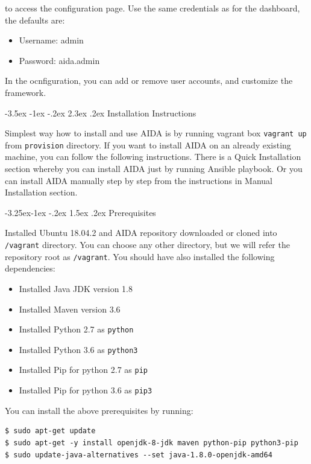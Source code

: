 \documentclass[a4paper]{article} %
\makeatletter
\renewcommand\section{\@startsection {section}{1}{\z@}%
                   {-3.5ex \@plus -1ex \@minus -.2ex}%
                   {2.3ex \@plus.2ex}%
                   {\normalfont\sffamily\Large\bfseries\color{projectcolor}}}
\renewcommand\subsection{\@startsection{subsection}{2}{\z@}%
                   {-3.25ex\@plus -1ex \@minus -.2ex}%
                   {1.5ex \@plus .2ex}%
                   {\normalfont\sffamily\large\bfseries\color{projectcolor}}}
\makeatother
\begin{document}
to access the configuration page. Use the same credentials as for the dashboard, the defaults are:
\begin{itemize}[noitemsep,nolistsep]
  \item[] Username: admin
  \item[] Password: aida.admin
\end{itemize}
In the ocnfiguration, you can add or remove user accounts, and customize the framework.

\cleardoublepage

\section{Installation Instructions}

Simplest way how to install and use AIDA is by running vagrant box \texttt{vagrant up} from \texttt{provision} directory.
If you want to install AIDA on an already existing machine, you can follow the following instructions. There is a Quick Installation
section whereby you can install AIDA just by running Ansible playbook. Or you can install AIDA manually step by step from
the instructions in Manual Installation section.

\subsection{Prerequisites}

Installed Ubuntu 18.04.2 and AIDA repository downloaded or cloned into \texttt{/vagrant} directory. You can choose any
other directory, but we will refer the repository root as \texttt{/vagrant}. You should have also installed the following dependencies:
\begin{itemize}[nolistsep,noitemsep]
    \item Installed Java JDK version 1.8
    \item Installed Maven version 3.6
    \item Installed Python 2.7 as \texttt{python}
    \item Installed Python 3.6 as \texttt{python3}
    \item Installed Pip for python 2.7 as \texttt{pip}
    \item Installed Pip for python 3.6 as \texttt{pip3}
\end{itemize}
You can install the above prerequisites by running:
\begin{lstlisting}
$ sudo apt-get update
$ sudo apt-get -y install openjdk-8-jdk maven python-pip python3-pip
$ sudo update-java-alternatives --set java-1.8.0-openjdk-amd64
\end{lstlisting}
\end{document}
